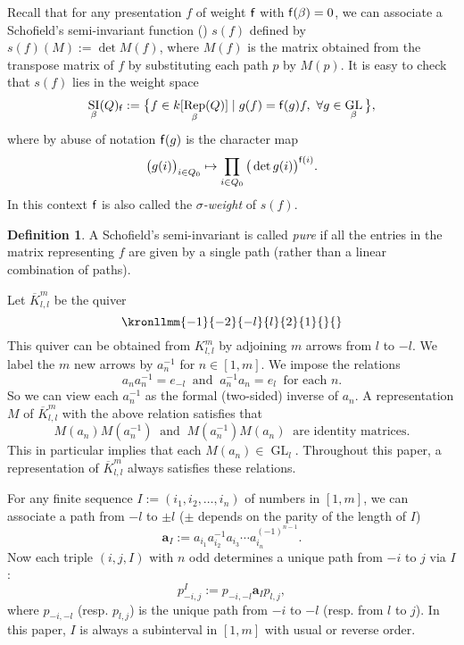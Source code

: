 \documentclass{amsart}
\theoremstyle{definition}
\newtheorem{definition}[theorem]{Definition}
\theoremstyle{remark}
\numberwithin{equation}{section}
\DeclareMathOperator{\GL}{GL}
\DeclareMathOperator{\Rep}{Rep}
\DeclareMathOperator{\SI}{SI}
\newcommand{\bs}[1]{\boldsymbol{#1}}
\newcommand{\br}[1]{\overline{#1}}
\newcommand{\f}{{\sf f}}
\newcommand{\kllm}{{K_{l,l}^m}}
\begin{document}
Recall that for any presentation $f$ of weight $\f$ with $\f(\beta)=0$,
we can associate a Schofield's semi-invariant function (\cite{S1}) $s(f)$ defined by 
$s(f)(M):=\det M(f)$, where $M(f)$ is the matrix obtained from the transpose matrix of $f$ by substituting each path $p$ by $M(p)$. 
It is easy to check that $s(f)$ lies in the weight space 
$$\SI_\beta(Q)_\f:=\big\{f\in k[\Rep_\beta(Q)]\mid g(f)=\f(g)f,\ \forall g\in\GL_\beta \big\},$$
where by abuse of notation $\f(g)$ is the character map 
$$\big(g(i)\big)_{i\in Q_0}\mapsto\prod_{i\in Q_0} \big(\det g(i)\big)^{\f(i)}.$$
In this context $\f$ is also called the {\em $\sigma$-weight} of $s(f)$.

\begin{definition} A Schofield's semi-invariant is called {\em pure} if all the entries in the matrix representing $f$ are given by a single path (rather than a linear combination of paths).
\end{definition}

Let $\br{K}_{l,l}^{m}$ be the quiver 
$$\kronllmm{-1}{-2}{-l}{l}{2}{1}{}{}$$
This quiver can be obtained from $\kllm$ by adjoining $m$ arrows from $l$ to $-l$.
We label the $m$ new arrows by $a_n^{-1}$ for $n\in[1,m]$.
We impose the relations
$$a_n a_n^{-1} = e_{-l}\ \text{ and }\ a_n^{-1} a_n = e_{l}\ \text{ for each $n$}.$$ 
So we can view each $a_n^{-1}$ as the formal (two-sided) inverse of $a_n$.
A representation $M$ of $\br{K}_{l,l}^{m}$ with the above relation satisfies that 
$$M(a_n)M(a_n^{-1})\ \text{ and }\ M(a_n^{-1})M(a_n)\ \text{ are identity matrices.}$$
This in particular implies that each $M(a_n)\in \GL_l$.
Throughout this paper, a representation of $\br{K}_{l,l}^{m}$ always satisfies these relations.

For any finite sequence $I:=(i_1,i_2,\dots,i_n)$ of numbers in $[1,m]$, we can associate a path from $-l$ to $\pm l$ ($\pm$ depends on the parity of the length of $I$)
$$\bs{a}_I:= a_{i_1} a_{i_2}^{-1} a_{i_3} \cdots a_{i_n}^{(-1)^{n-1}}.$$  
Now each triple $(i,j,I)$ with $n$ odd determines a unique path from $-i$ to $j$ via $I$:
$$p_{-i,j}^I:=p_{-i,-l} \bs{a}_I p_{l,j},$$
where $p_{-i,-l}$ (resp. $p_{l,j}$) is the unique path from $-i$ to $-l$ (resp. from $l$ to $j$).
In this paper, $I$ is always a subinterval in $[1,m]$ with usual or reverse order. 
\end{document}
